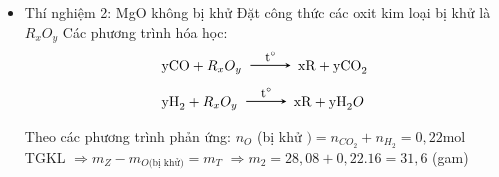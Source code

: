 \begin{vd}
{\begin{itemize}
			Vì $n_{\mathrm{NaOH}+\mathrm{Ba}(OH)_2}=0,08\mathrm{mol} < n_{CO_2}=0,09\mathrm{mol} < n_{OH}=0,12\ \mathrm{mol}$ $\Rightarrow$ kết tủa $\mathrm{BaCO}_3$ tan một phần.\\ $\Rightarrow$  Các muối sau phản ứng gồm $\mathrm{BaCO}_3, \mathrm{Ba}\left(HCO_3\right)_2, \mathrm{NaHCO}_3$
			\[\begin{aligned}
				& CO_2+\mathrm{Ba}(OH)_2 \xrightarrow \mathrm{BaCO}_3 \downarrow+H_2 O \\
				& 2CO_2+\mathrm{Ba}(OH)_2 \xrightarrow \mathrm{Ba}\left(HCO_3\right)_2 \\
				& CO_2+\mathrm{NaOH} \xrightarrow \mathrm{NaHCO}_3
			\end{aligned}\]
			Phân tích các phương trình phản ứng $\Rightarrow n_{\mathrm{BaCO}_3}=n_{OH}-n_{CO_2}=0,12-0,09=0,03\mathrm{mol}$\\
			$\Rightarrow m_1=0,03.197=5,91$ (gam)
			\item Thí nghiệm 2: MgO không bị khử
			Đặt công thức các oxit kim loại bị khử là $R_x O_y$
			Các phương trình hóa học:
			\[\begin{aligned}
				& \mathrm{yCO}+R_x O_y \xrightarrow[$\text{t}^\circ$] \mathrm{xR}+\mathrm{yCO}_2 \\
				& \mathrm{yH}_2+R_x O_y \xrightarrow[$\text{t}^\circ$]\mathrm{xR}+\mathrm{yH}_2 O
			\end{aligned}\]
			Theo các phương trình phản ứng: $n_O$ (bị khử $)=n_{CO_2}+n_{H_2}=0,22\mathrm{mol}$\\
			TGKL $\Rightarrow m_Z-m_{O\text{(bị khử)}}=m_T$  $\Rightarrow m_2=28,08 + 0,22.16=31,6$ (gam)
		\end{itemize}
	}
\end{vd}

